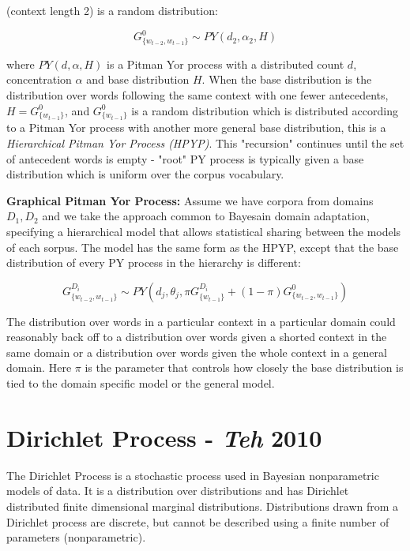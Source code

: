 \noindent (context length 2) is a random distribution:

\begin{equation}
G_{\{w_{t-2}, w_{t-1}\}}^{0} \sim PY(d_{2}, \alpha_{2}, H)
\label{eq:PYDistributionPY}
\end{equation}

\noindent where $PY(d, \alpha, H)$ is a Pitman Yor process with a distributed count $d$, concentration $\alpha$ and base distribution $H$. When the base distribution is the distribution over words following the same context with one fewer antecedents, $H=G_{\{w_{t-1}\}}^{0}$, and $G_{\{w_{t-1}\}}^{0}$ is a random distribution which is distributed according to a Pitman Yor process with another more general base distribution, this is a \textit{Hierarchical Pitman Yor Process (HPYP)}. This "recursion" continues until the set of antecedent words is empty - "root" PY process is typically given a base distribution which is uniform over the corpus vocabulary.

\textbf{Graphical Pitman Yor Process:} Assume we have corpora from domains $D_{1}, D_{2}$ and we take the approach common to Bayesain domain adaptation, specifying a hierarchical model that allows statistical sharing between the models of each sorpus. The model has the same form as the HPYP, except that the base distribution of every PY process in the hierarchy is different:

\begin{equation}
G_{\{w_{t-2}, w_{t-1}\}}^{D_{i}} \sim PY(d_{j}, \theta_{j}, \pi G_{\{w_{t-1}\}}^{D_{i}} + (1-\pi)G_{\{w_{t-2}, w_{t-1}\}}^{0})
\label{eq:graphicalPY}
\end{equation}

\noindent The distribution over words in a particular context in a particular domain could reasonably back off to a distribution over words given a shorted context in the same domain or a distribution over words given the whole context in a general domain. Here $\pi$ is the parameter that controls how closely the base distribution is tied to the domain specific model or the general model.

\section{Dirichlet Process - \textit{Teh} 2010} \cite{teh2010dirichlet}

The Dirichlet Process is a stochastic process used in Bayesian nonparametric models of data. It is a distribution over distributions and has Dirichlet distributed finite dimensional marginal distributions. Distributions drawn from a Dirichlet process are discrete, but cannot be described using a finite number of parameters (nonparametric).

